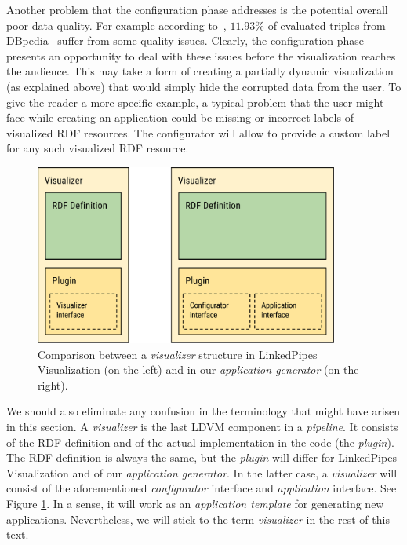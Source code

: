 Another problem that the configuration phase addresses is the potential overall poor data quality. For example according to~\cite{dbpedia_quality}, $11.93\%$ of evaluated triples from DBpedia~\cite{dbpedia} suffer from some quality issues.  Clearly, the configuration phase presents an opportunity to deal with these issues before the visualization reaches the audience. This may take a form of creating a partially dynamic visualization (as explained above) that would simply hide the corrupted data from the user. To give the reader a more specific example, a typical problem that the user might face while creating an application could be missing or incorrect labels of visualized RDF resources. The configurator will allow to provide a custom label for any such visualized RDF resource.
\begin{figure}
	\centering
	\includegraphics[width=100mm]{img/04_visualizer_comparision_scheme.png}
	\caption{Comparison between a \emph{visualizer} structure in LinkedPipes Visualization (on the left) and in our \emph{application generator} (on the right). } 
	\label{fig:visualizer-comparison-scheme}
\end{figure}

We should also eliminate any confusion in the terminology that might have arisen in this section. A \emph{visualizer} is the last LDVM component in a \emph{pipeline}. It consists of the RDF definition and of the actual implementation in the code (the \emph{plugin}). The RDF definition is always the same, but the  \emph{plugin} will differ for LinkedPipes Visualization and of our \emph{application generator}. In the latter case, a \emph{visualizer} will consist of the aforementioned \emph{configurator} interface and \emph{application} interface. See Figure \ref{fig:visualizer-comparison-scheme}. In a sense, it will work as an \emph{application template} for generating new applications. Nevertheless, we will stick to the term \emph{visualizer} in the rest of this text.

